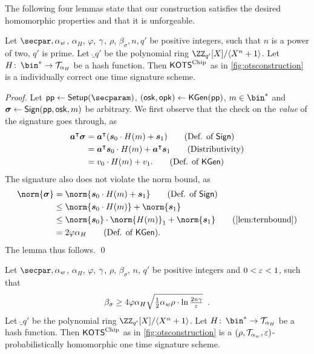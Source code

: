 The following four lemmas state that our construction satisfies the desired homomorphic properties and that it is unforgeable.
\begin{lemma}\label{lem:kots_ind_correct}
Let $\secpar, \alpha_w$, $\alpha_H$, $\varphi$, $\gamma$, $\rho$, $\beta_\sigma,n,q'$ be positive integers, such that $n$ is a power of two, $q'$ is prime.
  Let $\ring_{q'}$ be the polynomial ring $\defringqq$.
Let $H\colon\, \bin^* \to \tern_{\alpha_H}$ be a hash function.
  Then $\mathsf{KOTS}^{\textup{Chip}}$ as in \autoref{fig:otsconstruction} is a individually correct one time signature scheme.
\end{lemma}
\begin{proof}
  Let $\params \gets \setup(\secparam)$, $(\mathsf{osk},\mathsf{opk}) \gets \mathsf{KGen}(\mathsf{pp})$, $m\in\bin^*$ and $\boldsymbol{\sigma} \gets \mathsf{Sign}(\mathsf{pp},\mathsf{osk},m)$ be arbitrary.
  We first observe that the check on the \emph{value} of the signature goes through, as
  \begin{align*}
    \vec{a}^\transpose\vec{\sigma}
    ={}&\vec{a}^\transpose(\vec{s}_0\cdot H(m) + \vec{s}_1)\tag{Def. of $\sign$}\\
    ={}&\vec{a}^\transpose\vec{s}_0\cdot H(m) + \vec{a}^\transpose\vec{s}_1 \tag{Distributivity}\\
    ={}&v_0\cdot H(m) + v_1. \tag{Def. of $\kgen$}
  \end{align*}
  The signature also does not violate the norm bound, as
  \begin{align*}
    \norm{\vec{\sigma}}
    ={}&\norm{\vec{s}_0\cdot H(m) + \vec{s}_1} \tag{Def. of $\sign$}\\
    \leq{}&\norm{\vec{s}_0\cdot H(m)} + \norm{\vec{s}_1}\\
    \leq{}&\norm{\vec{s}_0}\cdot\norm{H(m)}_1 + \norm{\vec{s}_1} \tag{\autoref{lem:ternbound}}\\
    ={}&2\varphi\alpha_H \tag{Def. of $\kgen$}.
  \end{align*}
  The lemma thus follows.
  \qed
\end{proof}


\begin{lemma}\label{lem:kots_correct}
Let $\secpar, \alpha_w$, $\alpha_H$, $\varphi$, $\gamma$, $\rho$, $\beta_\sigma$, $n$, $q'$ be positive integers and $0 < \varepsilon < 1$, such that 
\[
\beta_\sigma \geq 4\varphi\alpha_H\sqrt{\tfrac{1}{2}\alpha_w\rho \cdot \ln\tfrac{2n\gamma}{\varepsilon}} \enspace.
\]
  Let $\ring_{q'}$ be the polynomial ring $\defringqq$.
  Let $H\colon\, \bin^* \to \tern_{\alpha_H}$ be a hash function.
  Then $\mathsf{KOTS}^{\textup{Chip}}$ as in \autoref{fig:otsconstruction} is a $(\rho,\mathcal{T}_{\alpha_w},\varepsilon)$-probabilistically homomorphic one time signature scheme.
\end{lemma}

